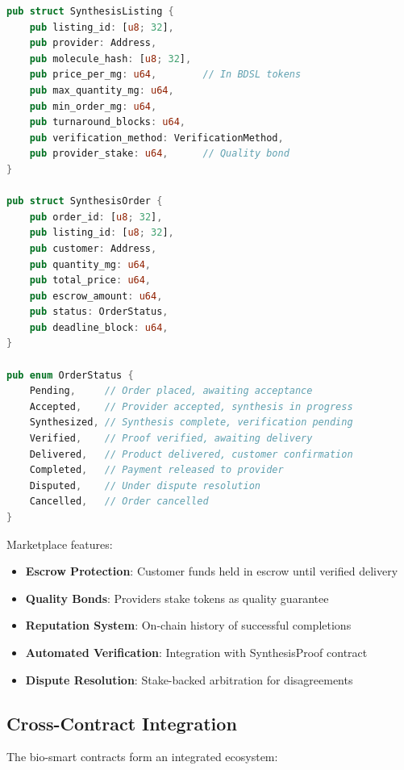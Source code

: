 \documentclass[12pt,a4paper]{article}
\begin{document}
\begin{lstlisting}[language=Rust,caption={Marketplace contract structures}]
pub struct SynthesisListing {
    pub listing_id: [u8; 32],
    pub provider: Address,
    pub molecule_hash: [u8; 32],
    pub price_per_mg: u64,        // In BDSL tokens
    pub max_quantity_mg: u64,
    pub min_order_mg: u64,
    pub turnaround_blocks: u64,
    pub verification_method: VerificationMethod,
    pub provider_stake: u64,      // Quality bond
}

pub struct SynthesisOrder {
    pub order_id: [u8; 32],
    pub listing_id: [u8; 32],
    pub customer: Address,
    pub quantity_mg: u64,
    pub total_price: u64,
    pub escrow_amount: u64,
    pub status: OrderStatus,
    pub deadline_block: u64,
}

pub enum OrderStatus {
    Pending,     // Order placed, awaiting acceptance
    Accepted,    // Provider accepted, synthesis in progress
    Synthesized, // Synthesis complete, verification pending
    Verified,    // Proof verified, awaiting delivery
    Delivered,   // Product delivered, customer confirmation
    Completed,   // Payment released to provider
    Disputed,    // Under dispute resolution
    Cancelled,   // Order cancelled
}
\end{lstlisting}

Marketplace features:

\begin{itemize}
    \item \textbf{Escrow Protection}: Customer funds held in escrow until verified delivery
    \item \textbf{Quality Bonds}: Providers stake tokens as quality guarantee
    \item \textbf{Reputation System}: On-chain history of successful completions
    \item \textbf{Automated Verification}: Integration with SynthesisProof contract
    \item \textbf{Dispute Resolution}: Stake-backed arbitration for disagreements
\end{itemize}

\subsection{Cross-Contract Integration}

The bio-smart contracts form an integrated ecosystem:
\end{document}
